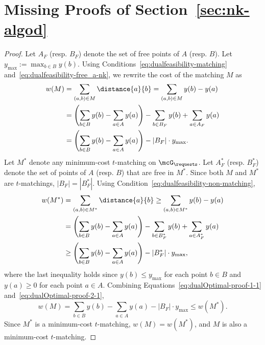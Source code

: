 %

%
%
%


















\section{Missing Proofs of Section~\ref{sec:nk-algod}}
\label{sec:nk-algo-appendix}


\partialoptimaltime*
\begin{proof}
Let $A_F$ (resp. $B_F$) denote the set of free points of $A$ (resp. $B$). Let $y_{\max}:=\max_{b\in B}y(b)$. 
Using Conditions~\eqref{eq:dualfeasibility-matching} and~\eqref{eq:dualfeasibility-free_a-nk}, we rewrite the cost of the matching $M$ as
\begin{align}
    w(M) &= \sum_{(a,b)\in M} \distance{a}{b} = \sum_{(a,b)\in M} y(b) - y(a)\nonumber \\ &= \left(\sum_{b\in B} y(b) - \sum_{a\in A} y(a)\right) - \sum_{b\in B_F} y(b) + \sum_{a\in A_F} y(a)\nonumber \\ &= \left(\sum_{b\in B} y(b) - \sum_{a\in A} y(a)\right) - |B_F|\cdot y_{\max}.
    \label{eq:dualOptimal-proof-1-1}
\end{align}
Let $M^*$ denote any minimum-cost $t$-matching on $\mcG_\requests$. Let $A^*_F$ (resp. $B^*_F$) denote the set of points of $A$ (resp. $B$) that are free in $M^*$. Since both $M$ and $M^*$ are $t$-matchings, $|B_F|=|B^*_F|$. Using Condition~\eqref{eq:dualfeasibility-non-matching},
\begin{align}
    w(M^*) &= \sum_{(a,b)\in M^*} \distance{a}{b} \ge \sum_{(a,b)\in M^*} y(b) - y(a)\nonumber \\ &= \left(\sum_{b\in B} y(b) - \sum_{a\in A} y(a)\right) - \sum_{b\in B^*_F} y(b) + \sum_{a\in A^*_F} y(a)\nonumber \\ &\ge \left(\sum_{b\in B} y(b) - \sum_{a\in A} y(a)\right) -  |B^*_F|\cdot y_{\max},
    \label{eq:dualOptimal-proof-2-1}
\end{align}
where the last inequality holds since $y(b)\le y_{\max}$ for each point $b\in B$ and $y(a)\ge 0$ for each point $a\in A$. Combining Equations~\eqref{eq:dualOptimal-proof-1-1} and~\eqref{eq:dualOptimal-proof-2-1},
\[w(M) = \sum_{b\in B} y(b) - \sum_{a\in A} y(a) - |B_F|\cdot y_{\max} \le w(M^*). \]
Since $M^*$ is a minimum-cost $t$-matching, $w(M)=w(M^*)$, and $M$ is also a minimum-cost $t$-matching.
\end{proof}




